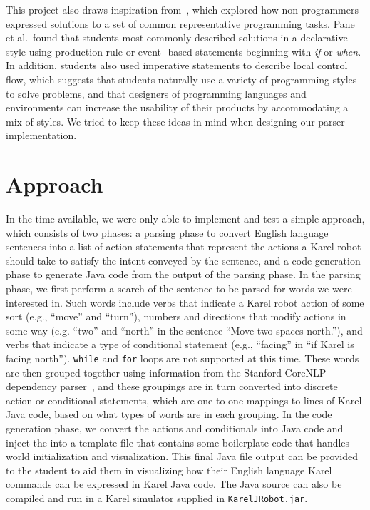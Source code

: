 \documentclass[11pt]{article}
\begin{document}
This project also draws inspiration from~, which explored how non-programmers
expressed solutions to a set of common representative programming tasks. Pane et al.\ found that
students most commonly described solutions in a declarative style using production-rule or event-
based statements beginning with \emph{if} or \emph{when}. In addition, students also used
imperative statements to describe local control flow, which suggests that students naturally use a
variety of programming styles to solve problems, and that designers of programming languages and
environments can increase the usability of their products by accommodating a mix of styles. We
tried to keep these ideas in mind when designing our parser implementation.

\section{Approach}
In the time available, we were only able to implement and test a simple approach, which consists of
two phases: a parsing phase to convert English language sentences into a list of action statements
that represent the actions a Karel robot should take to satisfy the intent conveyed by the
sentence, and a code generation phase to generate Java code from the output of the parsing phase.
In the parsing phase, we first perform a search of the sentence to be parsed for words we were
interested in. Such words include verbs that indicate a Karel robot action of some sort (e.g.,
``move'' and ``turn''), numbers and directions that modify actions in some way (e.g. ``two'' and
``north'' in the sentence ``Move two spaces north.''), and verbs that indicate a type of
conditional statement (e.g., ``facing'' in ``if Karel is facing north''). \texttt{while} and
\texttt{for} loops are not supported at this time. These words are then grouped together using
information from the Stanford CoreNLP dependency parser~\cite{Manning:2014aa}, and these groupings
are in turn converted into discrete action or conditional statements, which are one-to-one mappings
to lines of Karel Java code, based on what types of words are in each grouping. In the code
generation phase, we convert the actions and conditionals into Java code and inject the into a
template file that contains some boilerplate code that handles world initialization and
visualization. This final Java file output can be provided to the student to aid them in
visualizing how their English language Karel commands can be expressed in Karel Java code. The Java
source can also be compiled and run in a Karel simulator supplied in \texttt{KarelJRobot.jar}.
\end{document}

